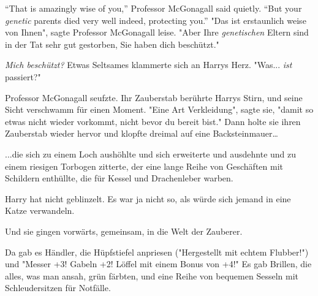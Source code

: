 “That is amazingly wise of you,” Professor McGonagall said quietly. “But your \emph{genetic} parents died very well indeed, protecting you.”
"Das ist erstaunlich weise von Ihnen", sagte Professor McGonagall leise. "Aber Ihre \emph{genetischen} Eltern sind in der Tat sehr gut gestorben, Sie haben dich beschützt."

\emph{Mich beschützt?} Etwas Seltsames klammerte sich an Harrys Herz. "Was... \emph{ist} passiert?" 

Professor McGonagall seufzte. Ihr Zauberstab berührte Harrys Stirn, und seine Sicht verschwamm für einen Moment. "Eine Art Verkleidung", sagte sie, "damit so etwas nicht wieder vorkommt, nicht bevor du bereit bist." Dann holte sie ihren Zauberstab wieder hervor und klopfte dreimal auf eine Backsteinmauer…

...die sich zu einem Loch aushöhlte und sich erweiterte und ausdehnte und zu einem riesigen Torbogen zitterte, der eine lange Reihe von Geschäften mit Schildern enthüllte, die für Kessel und Drachenleber warben.

Harry hat nicht geblinzelt. Es war ja nicht so, als würde sich jemand in eine Katze verwandeln.

Und sie gingen vorwärts, gemeinsam, in die Welt der Zauberer. 

Da gab es Händler, die Hüpfstiefel anpriesen ("Hergestellt mit echtem Flubber!") und "Messer +3! Gabeln +2! Löffel mit einem Bonus von +4!" Es gab Brillen, die alles, was man ansah, grün färbten, und eine Reihe von bequemen Sesseln mit Schleudersitzen für Notfälle. 

